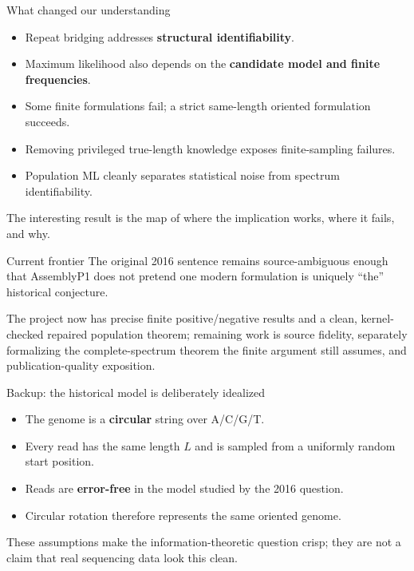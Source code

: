 \documentclass[aspectratio=169]{beamer}
\begin{document}
\begin{frame}{What changed our understanding}
\begin{itemize}
\item Repeat bridging addresses \textbf{structural identifiability}.
\item Maximum likelihood also depends on the \textbf{candidate model and finite frequencies}.
\item Some finite formulations fail; a strict same-length oriented formulation succeeds.
\item Removing privileged true-length knowledge exposes finite-sampling failures.
\item Population ML cleanly separates statistical noise from spectrum identifiability.
\end{itemize}
\vfill
\alert{The interesting result is the map of where the implication works, where it fails, and why.}
\end{frame}

\begin{frame}{Current frontier}
The original 2016 sentence remains source-ambiguous enough that AssemblyP1 does not pretend one modern formulation is uniquely ``the'' historical conjecture.\par\bigskip
The project now has precise finite positive/negative results and a clean, kernel-checked repaired population theorem; remaining work is source fidelity, separately formalizing the complete-spectrum theorem the finite argument still assumes, and publication-quality exposition.
\end{frame}

\appendix
\begin{frame}{Backup: the historical model is deliberately idealized}
\begin{itemize}
\item The genome is a \textbf{circular} string over A/C/G/T.
\item Every read has the same length $L$ and is sampled from a uniformly random start position.
\item Reads are \textbf{error-free} in the model studied by the 2016 question.
\item Circular rotation therefore represents the same oriented genome.
\end{itemize}
\vfill
\small These assumptions make the information-theoretic question crisp; they are not a claim that real sequencing data look this clean.
\end{frame}
\end{document}
